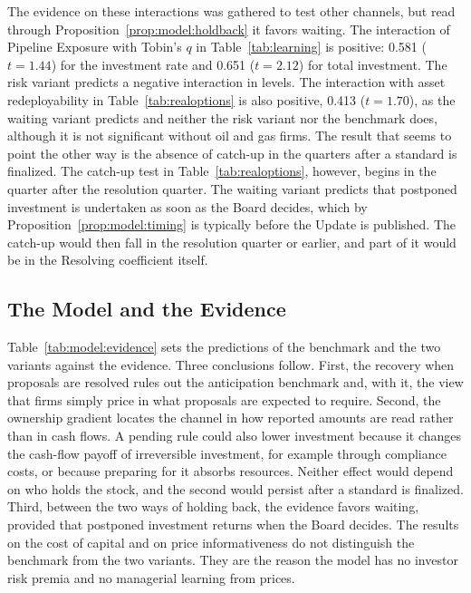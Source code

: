 The evidence on these interactions was gathered to test other channels, but read through Proposition~\ref{prop:model:holdback} it favors waiting. The interaction of Pipeline Exposure with Tobin's $q$ in Table~\ref{tab:learning} is positive: 0.581 ($t=1.44$) for the investment rate and 0.651 ($t=2.12$) for total investment. The risk variant predicts a negative interaction in levels. The interaction with asset redeployability in Table~\ref{tab:realoptions} is also positive, 0.413 ($t=1.70$), as the waiting variant predicts and neither the risk variant nor the benchmark does, although it is not significant without oil and gas firms. %
The result that seems to point the other way is the absence of catch-up in the quarters after a standard is finalized. The catch-up test in Table~\ref{tab:realoptions}, however, begins in the quarter after the resolution quarter. The waiting variant predicts that postponed investment is undertaken as soon as the Board decides, which by Proposition~\ref{prop:model:timing} is typically before the Update is published. The catch-up would then fall in the resolution quarter or earlier, and part of it would be in the Resolving coefficient itself.

\subsection{The Model and the Evidence}\label{sec:model:evidence}

Table~\ref{tab:model:evidence} sets the predictions of the benchmark and the two variants against the evidence. Three conclusions follow. First, the recovery when proposals are resolved rules out the anticipation benchmark and, with it, the view that firms simply price in what proposals are expected to require. Second, the ownership gradient locates the channel in how reported amounts are read rather than in cash flows. A pending rule could also lower investment because it changes the cash-flow payoff of irreversible investment, for example through compliance costs, or because preparing for it absorbs resources. Neither effect would depend on who holds the stock, and the second would persist after a standard is finalized. Third, between the two ways of holding back, the evidence favors waiting, provided that postponed investment returns when the Board decides. The results on the cost of capital and on price informativeness do not distinguish the benchmark from the two variants. They are the reason the model has no investor risk premia and no managerial learning from prices.

